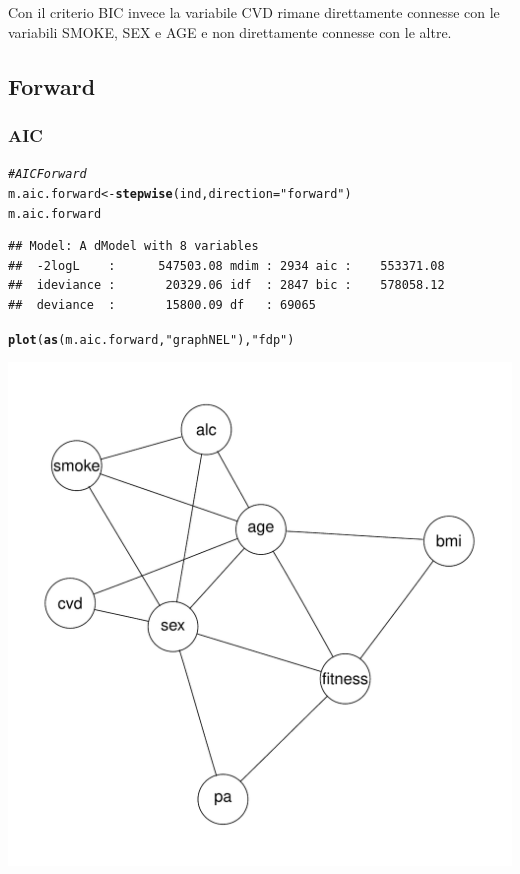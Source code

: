 \documentclass{article}\usepackage[]{graphicx}\usepackage[]{xcolor}
\makeatletter
\def\maxwidth{ %
  \ifdim\Gin@nat@width>\linewidth
    \linewidth
  \else
    \Gin@nat@width
  \fi
}
\newcommand{\hlstr}[1]{\textcolor[rgb]{0.192,0.494,0.8}{#1}}%
\newcommand{\hlcom}[1]{\textcolor[rgb]{0.678,0.584,0.686}{\textit{#1}}}%
\newcommand{\hlstd}[1]{\textcolor[rgb]{0.345,0.345,0.345}{#1}}%
\newcommand{\hlkwb}[1]{\textcolor[rgb]{0.69,0.353,0.396}{#1}}%
\newcommand{\hlkwc}[1]{\textcolor[rgb]{0.333,0.667,0.333}{#1}}%
\newcommand{\hlkwd}[1]{\textcolor[rgb]{0.737,0.353,0.396}{\textbf{#1}}}%
\newenvironment{kframe}{%
 \def\at@end@of@kframe{}%
 \ifinner\ifhmode%
  \def\at@end@of@kframe{\end{minipage}}%
  \begin{minipage}{\columnwidth}%
 \fi\fi%
 \def\FrameCommand##1{\hskip\@totalleftmargin \hskip-\fboxsep
 \colorbox{shadecolor}{##1}\hskip-\fboxsep
     \hskip-\linewidth \hskip-\@totalleftmargin \hskip\columnwidth}%
 \MakeFramed {\advance\hsize-\width
   \@totalleftmargin\z@ \linewidth\hsize
   \@setminipage}}%
 {\par\unskip\endMakeFramed%
 \at@end@of@kframe}
\newenvironment{knitrout}{}{} %
\makeatother
\begin{document}
      Con il criterio BIC invece la variabile CVD rimane direttamente connesse
      con le variabili SMOKE, SEX e AGE e non direttamente connesse con le altre.
      
  \subsection{Forward}
  
    \subsubsection{AIC}
\begin{knitrout}
\color{fgcolor}\begin{kframe}
\begin{alltt}
\hlcom{#AIC Forward}
\hlstd{m.aic.forward} \hlkwb{<-} \hlkwd{stepwise}\hlstd{(ind,} \hlkwc{direction}\hlstd{=}\hlstr{"forward"}\hlstd{)}
\hlstd{m.aic.forward}
\end{alltt}
\begin{verbatim}
## Model: A dModel with 8 variables
##  -2logL    :      547503.08 mdim : 2934 aic :    553371.08 
##  ideviance :       20329.06 idf  : 2847 bic :    578058.12 
##  deviance  :       15800.09 df   : 69065
\end{verbatim}
\begin{alltt}
\hlkwd{plot}\hlstd{(}\hlkwd{as}\hlstd{(m.aic.forward,} \hlstr{"graphNEL"}\hlstd{),} \hlstr{"fdp"}\hlstd{)}
\end{alltt}
\end{kframe}
\includegraphics[width=\maxwidth]{figure/Grafo_AIC_Forward-1} 
\end{knitrout}
     
\end{document}
